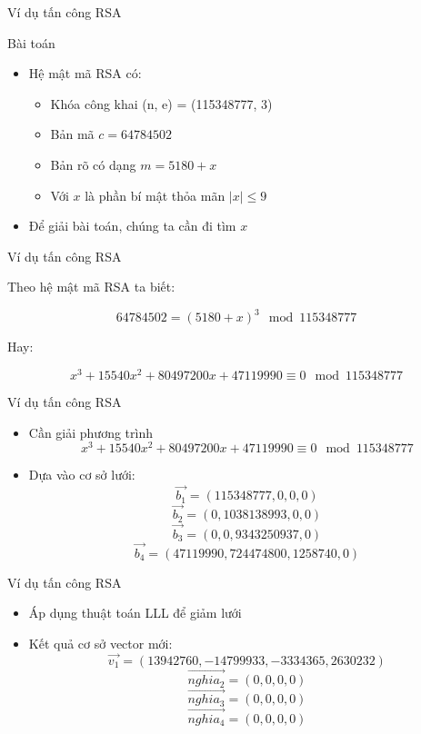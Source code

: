 \begin{frame}{Ví dụ tấn công RSA}

\begin{block}{Bài toán}
\begin{itemize}
\item Hệ mật mã RSA có:

\begin{itemize}
\item Khóa công khai (n, e) = (115348777, 3)
\item Bản mã $c = 64784502$
\item Bản rõ có dạng $m = 5180 + x$
\item Với $x$ là phần bí mật thỏa mãn $|x| \leq 9$
\end{itemize}
\item Để giải bài toán, chúng ta cần đi tìm $x$
\end{itemize}

\end{block}
\end{frame}
\begin{frame}{Ví dụ tấn công RSA}

Theo hệ mật mã RSA ta biết:

\[
64784502 = (5180 + x)^3 \mod 115348777
\]

Hay:

\[
x^3 + 15540x^2 + 80497200x + 47119990 \equiv 0 \mod 115348777
\]

\end{frame}
\begin{frame}{Ví dụ tấn công RSA}

\begin{itemize}
\item Cần giải phương trình
\[
x^3 + 15540x^2 + 80497200x + 47119990 \equiv 0 \mod 115348777
\]
\item Dựa vào cơ sở lưới:
\[
\vec{b_1} = (115348777, 0, 0, 0)
\]
\[
\vec{b_2} = (0, 1038138993, 0, 0)
\]
\[
\vec{b_3} = (0, 0, 9343250937, 0)
\]
\[
\vec{b_4} = (47119990, 724474800, 1258740, 0)
\]
\end{itemize}

\end{frame}
\begin{frame}{Ví dụ tấn công RSA}

\begin{itemize}
\item Áp dụng thuật toán LLL để giảm lưới
\item Kết quả cơ sở vector mới:
\[
\vec{v_1} = (13942760, -14799933, -3334365, 2630232)
\]
\[
\vec{nghia_2} = (0, 0, 0, 0)
\]
\[
\vec{nghia_3} = (0, 0, 0, 0)
\]
\[
\vec{nghia_4} = (0, 0, 0, 0)
\]

\end{itemize}

\end{frame}
